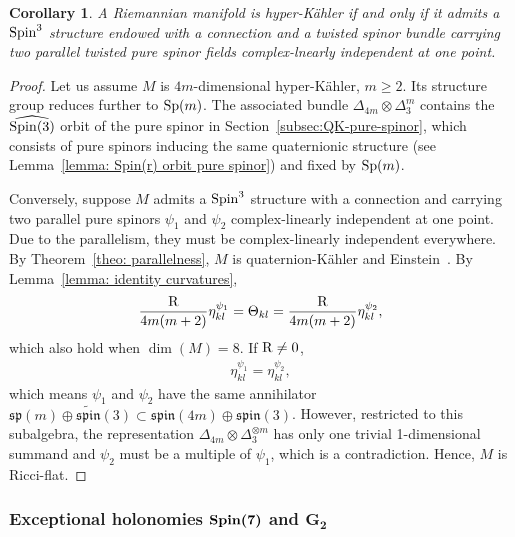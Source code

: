 \documentclass[pdftex]{sigma}
\numberwithin{equation}{section}
\newtheorem{Corollary}[Theorem]{Corollary}
\begin{document}
\begin{Corollary} A Riemannian manifold is hyper-K\"ahler if and only if it admits a ${\rm Spin}^3$ structure endowed with a connection and a twisted spinor bundle carrying two parallel twisted pure spinor fields complex-lnearly independent at one point.
\end{Corollary}
\begin{proof} Let us assume $M$ is $4m$-dimensional hyper-K\"ahler, $m\geq 2$. Its structure group reduces further to ${\rm Sp}(m)$. The associated bundle $\Delta_{4m}\otimes \Delta_3^{m}$ contains the $\widehat{{\rm Spin}(3)}$ orbit of the pure spinor in Section~\ref{subsec:QK-pure-spinor}, which consists of pure spinors inducing the same quaternionic structure (see Lemma~\ref{lemma: Spin(r) orbit pure spinor}) and fixed by ${\rm Sp}(m)$.

Conversely, suppose $M$ admits a ${\rm Spin}^3$ structure with a connection and carrying two parallel pure spinors $\psi_1$ and $\psi_2$ complex-linearly independent at one point. Due to the parallelism, they must be complex-linearly independent everywhere. By Theorem~\ref{theo: parallelness}, $M$ is quaternion-K\"ahler and Einstein~\cite{Berger}. By Lemma~\ref{lemma: identity curvatures},
\begin{gather*}{{\rm R}\over 4m (m+2)}\eta^{\psi_1}_{kl}=\Theta_{kl}={{\rm R}\over 4m (m+2)}\eta^{\psi_2}_{kl},\end{gather*}
which also hold when $\dim(M)=8$.
If ${\rm R}\not=0$,
\begin{gather*}\eta^{\psi_1}_{kl}=\eta^{\psi_2}_{kl},\end{gather*}
which means $\psi_1$ and $\psi_2$ have the same annihilator $\mathfrak{sp}(m)\oplus \widetilde{\mathfrak{spin}}(3)\subset\mathfrak{spin}(4m)\oplus \mathfrak{spin}(3)$.
However, restricted to this subalgebra, the representation $\Delta_{4m}\otimes \Delta_3^{\otimes m}$ has only one trivial 1-dimensional summand and
$\psi_2$ must be a multiple of $\psi_1$, which is a contradiction. Hence, $M$ is Ricci-flat.
\end{proof}

\subsubsection[Exceptional holonomies ${\rm Spin}(7)$ and $G_2$]{Exceptional holonomies $\boldsymbol{{\rm Spin}(7)}$ and $\boldsymbol{G_2}$}
\end{document}
